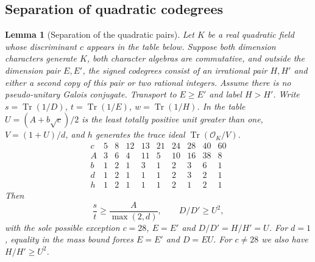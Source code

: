 \documentclass[11pt,reqno]{amsart}
\newtheorem{lemma}[theorem]{Lemma}
\theoremstyle{remark}\newtheorem{remark}[theorem]{Remark}
\numberwithin{equation}{section}
\begin{document}
\subsection{Separation of quadratic codegrees}
\begin{lemma}[Separation of the quadratic pairs]\label{lem:quadratic-mass-gap}
Let $K$ be a real quadratic field whose discriminant $c$ appears
in the table below. Suppose both dimension characters generate $K$,
both character algebras are commutative, and outside the dimension pair $E,E'$, the signed codegrees
consist of an irrational pair $H,H'$ and either a second copy of this
pair or two rational integers. Assume there is no pseudo-unitary
Galois conjugate. Transport to $E\ge E'$ and label $H>H'$.
Write $s=\operatorname{Tr}(1/D)$, $t=\operatorname{Tr}(1/E)$,
$w=\operatorname{Tr}(1/H)$.
In the table $U=(A+b\sqrt c)/2$ is the least totally positive unit
greater than one, $V=(1+U)/d$, and $h$ generates the trace ideal
$\operatorname{Tr}(\mathcal O_K/V)$.
\[
\begin{array}{c|rrrrrrrrr}
 c&5&8&12&13&21&24&28&40&60\\ \hline
 A&3&6&4&11&5&10&16&38&8\\
 b&1&2&1&3&1&2&3&6&1\\
 d&1&2&1&1&1&2&3&2&1\\
 h&1&2&1&1&1&2&1&2&1
\end{array}
\]
Then
\[
   \frac{s}{t}\ge\frac{A}{\max(2,d)},\qquad D/D'\ge U^2,
\]
with the sole possible exception $c=28$, $E=E'$ and
$D/D'=H/H'=U$. For $d=1$, equality in the mass bound forces
$E=E'$ and $D=EU$. For $c\ne28$ we also have $H/H'\ge U^2$.
\end{lemma}
\end{document}
